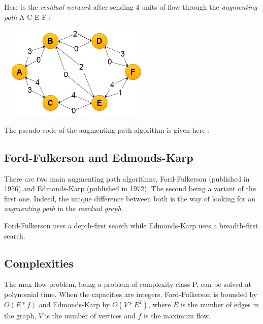 Here is the \textit{residual network} after sending 4 units of flow through the \textit{augmenting path} A-C-E-F : \newline

\begin{center}
\includegraphics[width=7.5cm,height=4.5cm]{images/residualgraph2.png}
\end{center}

The pseudo-code of the augmenting path algorithm is given here :

\begin{algorithm}[h]

\end{algorithm}

\subsection{Ford-Fulkerson and Edmonds-Karp}
There are two main augmenting path algorithms, Ford-Fulkerson (published in 1956) and Edmonds-Karp (published in 1972). The second being a variant of the first one. Indeed, the unique difference between both is the way of looking for an \textit{augmenting path} in the \textit{residual graph}. \newline

Ford-Fulkerson uses a depth-first search while Edmonds-Karp uses a breadth-first search.



\subsection{Complexities}
The max flow problem, being a problem of complexity class P, can be solved at polynomial time. When the capacities are integers, Ford-Fulkerson is bounded by $O(E*f)$ and Edmonds-Karp by $O(V*E^2)$, where $E$ is the number of edges in the graph, $V$ is the number of vertices and $f$ is the maximum flow.

